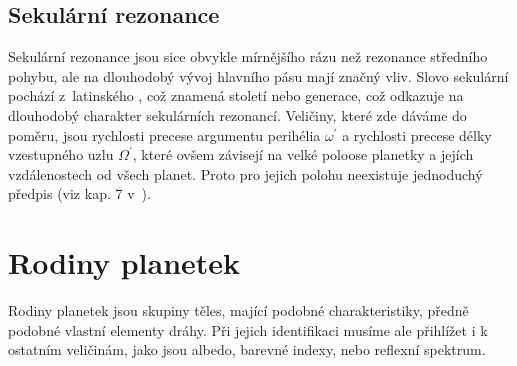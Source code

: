 \documentclass[A4paper, 12pt, oneside]{book}
\begin{document}
\subsection{Sekulární rezonance} 
Sekulární rezonance jsou sice obvykle mírnějšího rázu než rezonance středního pohybu, ale na dlouhodobý vývoj hlavního pásu mají značný vliv. Slovo sekulární pochází z~latinského , což znamená století nebo generace, což odkazuje na dlouhodobý charakter sekulárních rezonancí. Veličiny, které zde dáváme do poměru, jsou rychlosti precese argumentu perihélia $\omega^\prime$ a rychlosti precese délky vzestupného uzlu $\Omega^\prime$, které ovšem závisejí na velké poloose planetky a jejích vzdálenostech od všech planet. Proto pro jejich polohu neexistuje jednoduchý předpis (viz kap. 7 v~\cite{murray00}).

\pagebreak
\section{Rodiny planetek}

Rodiny planetek jsou skupiny těles, mající podobné charakteristiky, předně podobné vlastní elementy dráhy. Při jejich identifikaci musíme ale přihlížet i k ostatním veličinám, jako jsou albedo, barevné indexy, nebo reflexní spektrum. 
\end{document}
